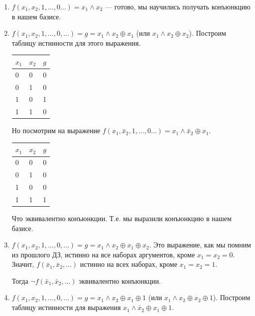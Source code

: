 \documentclass{article}
\begin{document}
    \begin{enumerate}
        \item $f(x_1, x_2, 1, \ldots, 0\ldots) = x_1 \wedge x_2$ --- готово, мы научились получать конъюнкцию в нашем базисе.

        \item $f(x_1, x_2, 1, \ldots, 0, \ldots) = g = x_1 \wedge x_2 \oplus x_1$ (или $x_1 \wedge x_2 \oplus x_2$). Построим таблицу истинности для этого выражения.

        \begin{tabular}{ | l | l | l | }
            \hline
            $x_1$ & $x_2$ & $g$ \\ \hline
             0 & 0 & 0\\
             0 & 1 & 0 \\
             1 & 0 & 1 \\
             1 & 1 & 0 \\
            \hline
        \end{tabular}

        Но посмотрим на выражение $f(x_1, \bar{x}_2, 1, \ldots, 0 \ldots) = x_1 \wedge \bar{x}_2 \oplus x_1$.

        \begin{tabular}{ | l | l | l | }
            \hline
            $x_1$ & $x_2$ & $g$ \\ \hline
             0 & 0 & 0 \\
             0 & 1 & 0 \\
             1 & 0 & 0 \\
             1 & 1 & 1 \\
            \hline
        \end{tabular}

        Что эквивалентно конъюнкции. Т.е. мы выразили конъюнкцию в нашем базисе.

        \item $f(x_1, x_2, 1, \ldots, 0, \ldots) = g = x_1 \wedge x_2 \oplus x_1 \oplus x_2$. Это выражение, как мы помним из прошлого ДЗ, истинно на все наборах аргументов, кроме $x_1=x_2=0$. Значит, $f(\bar{x}_1, \bar{x}_2, \ldots)$ истинно на всех наборах, кроме $x_1=x_2=1$.

        Тогда $\neg f(\bar{x}_1, \bar{x}_2, \ldots)$ эквивалентно конъюнкции.

        \item $f(x_1, x_2, 1, \ldots, 0, \ldots) = g = x_1 \wedge x_2 \oplus x_1 \oplus 1$ (или $x_1 \wedge x_2 \oplus x_2 \oplus 1$). Построим таблицу истинности для выражения $x_1 \wedge \bar{x}_2 \oplus x_1 \oplus 1$.


\end{enumerate}
\end{document}
